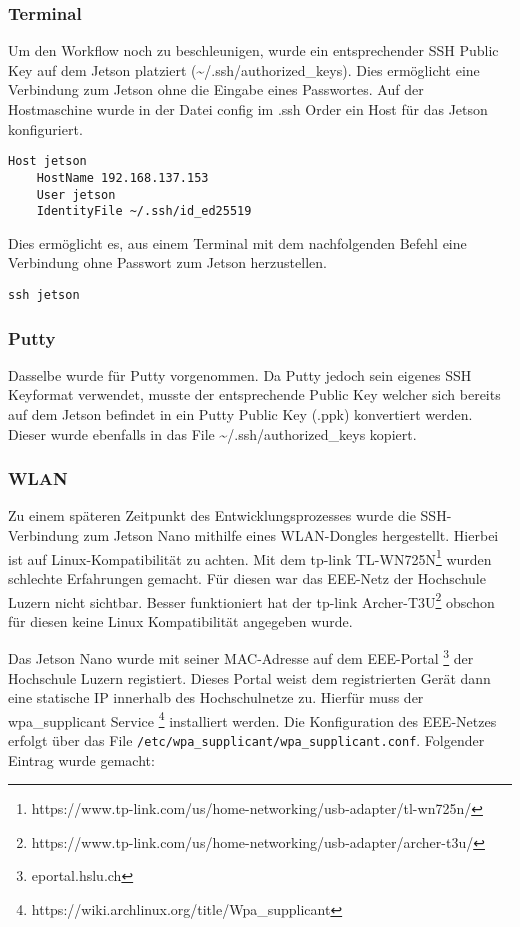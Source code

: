 \subsubsection{Terminal}
Um den Workflow noch zu beschleunigen, wurde ein entsprechender SSH Public Key auf dem Jetson platziert (\textasciitilde/.ssh/authorized\_keys). Dies ermöglicht eine Verbindung zum Jetson ohne die Eingabe eines Passwortes. Auf der Hostmaschine wurde in der Datei config im .ssh Order ein Host für das Jetson konfiguriert.

\begin{verbatim}
Host jetson
	HostName 192.168.137.153
	User jetson
	IdentityFile ~/.ssh/id_ed25519
\end{verbatim}

Dies ermöglicht es, aus einem Terminal mit dem nachfolgenden Befehl eine Verbindung ohne Passwort zum Jetson herzustellen.
\begin{verbatim}
ssh jetson
\end{verbatim}

\subsubsection{Putty}
Dasselbe wurde für Putty vorgenommen. Da Putty jedoch sein eigenes SSH Keyformat verwendet, musste der entsprechende Public Key welcher sich bereits auf dem Jetson befindet in ein Putty Public Key (.ppk) konvertiert werden. Dieser wurde ebenfalls in das File \textasciitilde/.ssh/authorized\_keys kopiert. 

\subsubsection{WLAN}
Zu einem späteren Zeitpunkt des Entwicklungsprozesses wurde die SSH-Verbindung zum Jetson Nano mithilfe eines WLAN-Dongles hergestellt. Hierbei ist auf Linux-Kompatibilität zu achten. Mit dem tp-link TL-WN725N\footnote{https://www.tp-link.com/us/home-networking/usb-adapter/tl-wn725n/} wurden schlechte Erfahrungen gemacht. Für diesen war das EEE-Netz der Hochschule Luzern nicht sichtbar. Besser funktioniert hat der tp-link Archer-T3U\footnote{https://www.tp-link.com/us/home-networking/usb-adapter/archer-t3u/} obschon für diesen keine Linux Kompatibilität angegeben wurde. 

Das Jetson Nano wurde mit seiner MAC-Adresse auf dem EEE-Portal \footnote{eportal.hslu.ch} der Hochschule Luzern registiert. Dieses Portal weist dem registrierten Gerät dann eine statische IP innerhalb des Hochschulnetze zu. Hierfür muss der wpa\_supplicant Service \footnote{https://wiki.archlinux.org/title/Wpa\_supplicant} installiert werden. Die Konfiguration des EEE-Netzes erfolgt über das File \texttt{/etc/wpa\_supplicant/wpa\_supplicant.conf}. Folgender Eintrag wurde gemacht:


